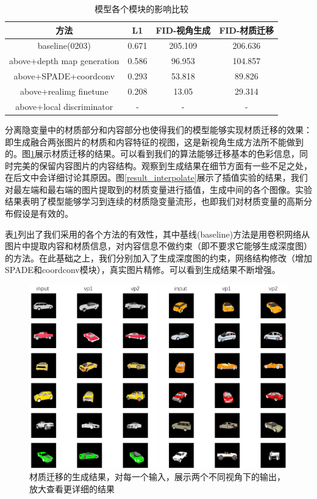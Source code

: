 \documentclass[UTF8,openany,AutoFakeBold,AutoFakeSlant,cs4size]{ctexbook}
\begin{document}
\begin{table}[h]
\small %
\centering
\caption{模型各个模块的影响比较}
\label{ablation_study}
\begin{tabular}{cccc} %
\toprule %
方法 & L1 & FID-视角生成 & FID-材质迁移 \\
\midrule
baseline(0203) & 0.671 & 205.109 & 206.636 \\
above+depth map generation & 0.586 & 96.953 & 104.857 \\
above+SPADE+coordconv & 0.293 & 53.818 & 89.826 \\
above+realimg finetune & 0.208 & 13.05 & 29.314 \\
above+local discriminator & - & - & - \\
\bottomrule
\end{tabular}
\end{table}

分离隐变量中的材质部分和内容部分也使得我们的模型能够实现材质迁移的效果：即生成融合两张图片的材质和内容特征的视图，这是新视角生成方法所不能做到的。图\ref{result_styletrans}展示材质迁移的结果。可以看到我们的算法能够迁移基本的色彩信息，同时完美的保留内容图片的内容结构。观察到生成结果在细节方面有一些不足之处，在后文中会详细讨论其原因。图\ref{result_interpolate}展示了插值实验的结果，我们对最左端和最右端的图片提取到的材质变量进行插值，生成中间的各个图像。实验结果表明了模型能够学习到连续的材质隐变量流形，也即我们对材质变量的高斯分布假设是有效的。

表\ref{ablation_study}列出了我们采用的各个方法的有效性，其中基线(baseline)方法是用卷积网络从图片中提取内容和材质信息，对内容信息不做约束（即不要求它能够生成深度图）的方法。在此基础之上，我们分别加入了生成深度图的约束，网络结构修改（增加SPADE和coordconv模块），真实图片精修。可以看到生成结果不断增强。

\begin{figure}
\centering
\includegraphics[width=\linewidth]{./images/style_transfer_thesis.png}
\caption{材质迁移的生成结果，对每一个输入，展示两个不同视角下的输出，放大查看更详细的结果}
\label{result_styletrans}
\end{figure}
\end{document}
